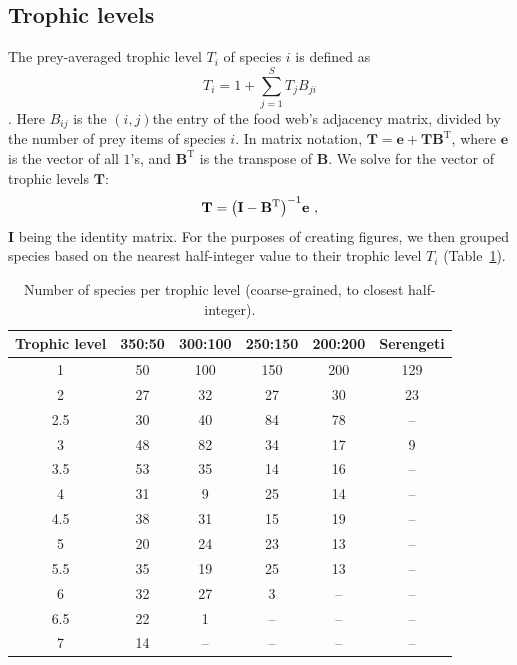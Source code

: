 \documentclass[11pt]{article}
\let\originalleft\left
\let\originalright\right
\renewcommand{\left}{\mathopen{}\mathclose\bgroup\originalleft}
\renewcommand{\right}{\aftergroup\egroup\originalright}
\begin{document}
\subsection{Trophic levels} \label{sec:tls}

The prey-averaged trophic level $T_i$ of species $i$ is defined as
\begin{equation}
  \label{eq:patl1}
  T_i = 1 + \sum_{j=1}^S T_j B_{ji}
\end{equation}
\citep{WilliamsMartinez2004}. Here $B_{ij}$ is the $(i,j)$the entry of the food web's adjacency matrix, divided by the number of prey items of species $i$. In matrix notation, $\mathbf{T} = \mathbf{e} + \mathbf{T} \mathbf{B}^{\mathrm{T}}$, where $\mathbf{e}$ is the vector of all $1$'s, and $\mathbf{B}^{\mathrm{T}}$ is the transpose of $\mathbf{B}$. We solve for the vector of trophic levels $\mathbf{T}$:
\begin{equation}
  \label{eq:patl2}
  \mathbf{T} = \left( \mathbf{I} - \mathbf{B}^{\mathrm{T}} \right)^{-1}
  \mathbf{e} \ ,
\end{equation}
$\mathbf{I}$ being the identity matrix. For the purposes of creating figures, we then grouped species based on the nearest half-integer value to their trophic level $T_i$ (Table~\ref{table:trophic_levels}).

\begin{table}[!ht]
\centering
\caption{Number of species per trophic level (coarse-grained, to closest half-integer). }
\begin{tabular}{cccccc}
  \hline
 Trophic level & 350:50 & 300:100 & 250:150 & 200:200 & Serengeti  \\ 
  \hline
  1   &  50 &  100 & 150 &  200 &  129 \\ 
  2   &  27 &  32 &  27 &   30  &  23  \\ 
  2.5 &  30 &  40  &  84 &  78  &  --  \\
  3   &  48 &  82  &  34 &  17  &  9   \\ 
  3.5 &  53 &  35  &  14 &  16  &  --  \\ 
  4   &  31 &  9   &  25 &  14  &  --  \\ 
  4.5 &  38 &  31  &  15 &  19  &  --  \\ 
  5   &  20 &  24  &  23 &  13  &  --  \\ 
  5.5 &  35 &  19  &  25 &  13  &  --  \\ 
  6   &  32 &  27  &   3 &  --  &  --  \\ 
  6.5 &  22 &   1  &  -- &  --  &  --  \\ 
  7   &  14 &   --  &  -- &  -- &  --  \\ 
   \hline
\end{tabular}
\label{table:trophic_levels}
\end{table}
\end{document}
